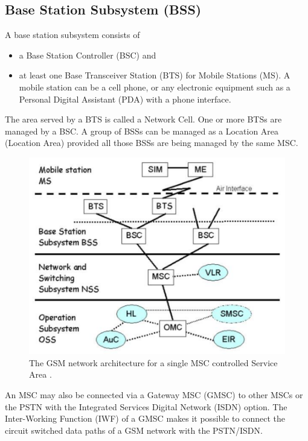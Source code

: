 \subsection{Base Station Subsystem (BSS)}

A base station subsystem consists of
\begin{itemize}[noitemsep,topsep=0pt,parsep=0pt,partopsep=0pt] 
\item a Base Station Controller (BSC) and
\item at least one Base Transceiver Station (BTS) for Mobile Stations (MS).
A mobile station can be a cell phone, or any electronic equipment such as a 
Personal Digital Assistant (PDA) with a phone interface.
\end{itemize}

The area served by a BTS is called a Network Cell. One or more BTSs
are managed by a BSC.  A group of BSSs can be managed as a Location 
Area (Location Area) provided all those BSSs are being managed by the same 
MSC.


\begin{figure}
\centering
\includegraphics[scale=0.7]{../images/archMSCServiceArea}
\caption[Network architecture for a single MSC Service Area]{The GSM network 
architecture for a single MSC controlled Service Area {\cite{arcadaFi}}.}
\end{figure}


An MSC may also be connected via a Gateway MSC (GMSC) to other MSCs or the
PSTN with the Integrated Services Digital Network (ISDN) option. The 
Inter-Working Function (IWF) of a GMSC makes it possible to connect the 
circuit switched data paths of a GSM network with the PSTN/ISDN.


